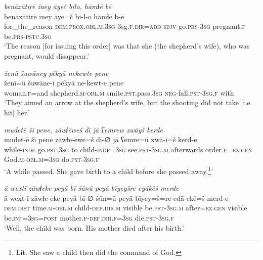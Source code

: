 \ea \label{KŠ.18}
\textit{benāxātirē īney āyeč bilo, hāmɫē bē} \\ 
\gll benāxātirē īney āye=č bi-l-o hāmɫē b-ē \\ 
 for\_the\_reason \textsc{dem.prox}\textsc{.obl}\textsc{.m}\textsc{.3sg} 3sg\textsc{.f}\textsc{.dir}\textsc{=add} \textsc{sbjv-}go\textsc{.prs}\textsc{-3sg} pregnant\textsc{.f} be\textsc{.prs}\textsc{-pstc}\textsc{.3sg} \\ 
\glt `The reason [for issuing this order] was that she (the shepherd’s wife), who was pregnant, would disappear.'
\z 
 
\ea \label{KŠ.20}
\textit{ženū šuwāney pēkyā nekewte pene} \\ 
\gll ženī=ū šuwāne-ī pēkyā ne-kewt-e pene \\ 
 woman\textsc{.f}=and shepherd\textsc{.m}\textsc{-obl}\textsc{.m} smite\textsc{.pst}.pass\textsc{.3sg} \textsc{neg-}fall\textsc{.pst}\textsc{-3sg}\textsc{.f} with \\ 
\glt `They aimed an arrow at the shepherd’s wife, but the shooting did not take [i.e. hit] her.'
\z 
 
\ea \label{KŠ.22}
\textit{mudetē šī pene, zāwɫēweš dī jā ʕemrew xwāyš kerde} \\ 
\gll mudet-ē šī pene zāwɫe-ēwe=š dī-∅ jā ʕemre=ū xwā-ī=š kerd-e \\ 
 while\textsc{-indf} go\textsc{.pst}\textsc{.3sg} to child\textsc{-indf}\textsc{=3sg} see\textsc{.pst}\textsc{-3sg}\textsc{.m} afterwards order\textsc{.f}\textsc{=ez.gen} God\textsc{.m}\textsc{-obl}\textsc{.m}\textsc{=3sg} do\textsc{.pst}\textsc{-3sg}\textsc{.f} \\ 
\glt `A while passed. She gave birth to a child before she passed away.\footnote{Lit. She saw a child then did the command of God.}'
\z 
 
\ea \label{KŠ.23}
\textit{ā wextī zāwɫeke peyā bī šūnū peyā bīyeyšre eyākēš merđe} \\ 
\gll ā wext-ī zāwɫe-eke peyā bī-∅ šūn=ū peyā bīyey=š=re eđā-ekē=š merđ-e \\ 
 \textsc{dem.dist} time\textsc{.m}\textsc{-obl}\textsc{.m} child\textsc{-def}\textsc{.dir}\textsc{.m} visible be\textsc{.pst}\textsc{-3sg}\textsc{.m} after\textsc{=ez.gen} visible be\textsc{.inf}\textsc{=3sg}\textsc{=\textsc{post}} mother\textsc{.f}\textsc{-def}\textsc{.dir}\textsc{.f}\textsc{=3sg} die\textsc{.pst}\textsc{-3sg}\textsc{.f} \\ 
\glt `Well, the child was born. His mother died after his birth.'
\z 
 
